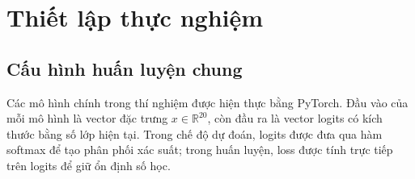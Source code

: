 

\section{Thiết lập thực nghiệm}

\subsection{Cấu hình huấn luyện chung}

Các mô hình chính trong thí nghiệm được hiện thực bằng PyTorch. Đầu vào của mỗi mô hình là vector đặc trưng $x\in\mathbb{R}^{20}$, còn đầu ra là vector logits có kích thước bằng số lớp hiện tại. Trong chế độ dự đoán, logits được đưa qua hàm softmax để tạo phân phối xác suất; trong huấn luyện, loss được tính trực tiếp trên logits để giữ ổn định số học.

